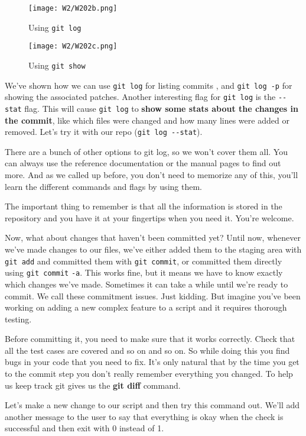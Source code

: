 \begin{figure} 
	\caption{Using \texttt{git log} }
	\centering
	\texttt{[image: W2/W202b.png]}
	\label{W202b}
\end{figure}

\begin{figure} 
	\caption{Using \texttt{git show} }
	\centering
	\texttt{[image: W2/W202c.png]}
	\label{W202c}
\end{figure}
	
	We've shown how we can use \texttt{git log} for listing commits , and \verb|git log -p| for showing the associated patches. Another interesting flag for \texttt{git log} is the \verb|--stat| flag. This will cause \texttt{git log} to \textbf{show some stats about the changes in the commit}, like which files were changed and how many lines were added or removed. Let's try it with our repo (\verb|git log --stat|).

	There are a bunch of other options to git log, so we won't cover them all. You can always use the reference documentation or the manual pages to find out more. And as we called up before, you don't need to memorize any of this, you'll learn the different commands and flags by using them.
	
	The important thing to remember is that all the information is stored in the repository and you have it at your fingertips when you need it. You're welcome.
	
	Now, what about changes that haven't been committed yet? Until now, whenever we've made changes to our files, we've either added them to the staging area with \texttt{git add} and committed them with \texttt{git commit}, or committed them directly using \texttt{git commit} \verb|-a|. This works fine, but it means we have to know exactly which changes we've made. Sometimes it can take a while until we're ready to commit. We call these commitment issues. Just kidding. But imagine you've been working on adding a new complex feature to a script and it requires thorough testing.
	
	Before committing it, you need to make sure that it works correctly. Check that all the test cases are covered and so on and so on. So while doing this you find bugs in your code that you need to fix. It's only natural that by the time you get to the commit step you don't really remember everything you changed. To help us keep track git gives us the \textbf{git diff} command.
	
	Let's make a new change to our script and then try this command out. We'll add another message to the user to say that everything is okay when the check is successful and then exit with 0 instead of 1.
	

